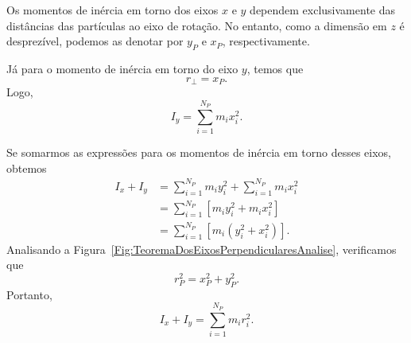 \begin{marginfigure}[2cm]
\centering
{}
\caption{Os momentos de inércia em torno dos eixos $x$ e $y$ dependem exclusivamente das distâncias das partículas ao eixo de rotação. No entanto, como a dimensão em $z$ é desprezível, podemos as denotar por $y_P$ e $x_P$, respectivamente. \label{Fig:TeoremaDosEixosPerpendicularesAnalise}}
\end{marginfigure}

Já para o momento de inércia em torno do eixo $y$, temos que
\begin{equation}
    r_\perp = x_P.
\end{equation}
%
Logo,
\begin{equation}
    I_y = \sum_{i = 1}^{N_P} m_i x_i^2.
\end{equation}

Se somarmos as expressões para os momentos de inércia em torno desses eixos, obtemos
\begin{align}
    I_x + I_y &= \sum_{i = 1}^{N_P} m_i y_i^2 + \sum_{i = 1}^{N_P} m_i x_i^2 \\
    &= \sum_{i = 1}^{N_P} \left[ m_i y_i^2 + m_i x_i^2\right] \\
    &= \sum_{i = 1}^{N_P} \left[ m_i (y_i^2 + x_i^2)\right].
\end{align}
%
Analisando a Figura~\ref{Fig:TeoremaDosEixosPerpendicularesAnalise}, verificamos que
\begin{equation}
    r_P^2 = x_P^2 + y_P^2.
\end{equation}
%
Portanto,
\begin{equation}
    I_x + I_y = \sum_{i = 1}^{N_P} m_i r_i^2.
\end{equation}

